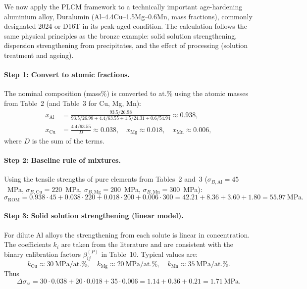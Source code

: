 \documentclass[12pt,a4paper]{article}
\begin{document}
	We now apply the PLCM framework to a technically important age-hardening
	aluminium alloy, Duralumin (Al--4.4Cu--1.5Mg--0.6Mn, mass fractions),
	commonly designated 2024 or D16T in its peak-aged condition.
	The calculation follows the same physical principles as the bronze example:
	solid solution strengthening, dispersion strengthening from precipitates,
	and the effect of processing (solution treatment and ageing).
	
	\paragraph{Step 1: Convert to atomic fractions.}
	The nominal composition (mass\%) is converted to at.\% using the atomic masses
	from Table~2 (and Table~3 for Cu, Mg, Mn):
	\[
	\begin{aligned}
		x_{\mathrm{Al}} &= \frac{93.5/26.98}{93.5/26.98+4.4/63.55+1.5/24.31+0.6/54.94} \approx 0.938,\\
		x_{\mathrm{Cu}} &= \frac{4.4/63.55}{D} \approx 0.038,\quad
		x_{\mathrm{Mg}} \approx 0.018,\quad
		x_{\mathrm{Mn}} \approx 0.006,
	\end{aligned}
	\]
	where $D$ is the sum of the terms.
	
	\paragraph{Step 2: Baseline rule of mixtures.}
	Using the tensile strengths of pure elements from Tables~2 and~3
	($\sigma_{B,\mathrm{Al}}=45$~MPa, $\sigma_{B,\mathrm{Cu}}=220$~MPa,
	$\sigma_{B,\mathrm{Mg}}=200$~MPa, $\sigma_{B,\mathrm{Mn}}=300$~MPa):
	\[
	\sigma_{\mathrm{ROM}} = 0.938\cdot45 + 0.038\cdot220 + 0.018\cdot200 + 0.006\cdot300
	= 42.21 + 8.36 + 3.60 + 1.80 = 55.97\ \text{MPa}.
	\]
	
	\paragraph{Step 3: Solid solution strengthening (linear model).}
	For dilute Al alloys the strengthening from each solute is linear in
	concentration. The coefficients $k_i$ are taken from the literature and are
	consistent with the binary calibration factors $\beta_{ij}^{(P)}$ in
	Table~10. Typical values are:
	\[
	k_{\mathrm{Cu}} \approx 30\ \text{MPa/at.\%},\quad
	k_{\mathrm{Mg}} \approx 20\ \text{MPa/at.\%},\quad
	k_{\mathrm{Mn}} \approx 35\ \text{MPa/at.\%}.
	\]
	Thus
	\[
	\Delta\sigma_{\mathrm{ss}} = 30\cdot0.038 + 20\cdot0.018 + 35\cdot0.006
	= 1.14 + 0.36 + 0.21 = 1.71\ \text{MPa}.
	\]
	
\end{document}
